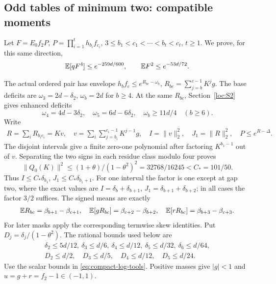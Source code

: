 \subsection{Odd tables of minimum two: compatible moments}\label{loc:S15}
Let $F=E_0f_2P$, $P=\prod_{i=1}^t h_{b_i}f_{c_i}$,
$3\le b_1<c_1<\cdots<b_t<c_t$, $t\ge1$.
We prove, for this same direction,
\[
 \mathbb E[qF^4]\le e^{-259d/600},\qquad \mathbb E F^2\le e^{-53d/72}.
\]

The actual ordered pair has envelope $h_bf_c\le e^{R_{bc}-\omega_b}$,
$R_{bc}=\sum_{j=b}^{c-1}K^jg$.
The base deficits are $\omega_3=2d-\delta_{2}$, $\omega_b=2d$ for $b\ge4$.
At the same $R_{bc}$, Section~\ref{loc:S2} gives enhanced deficits
\[
 \omega_4=4d-3\delta_{2},\quad\omega_5=6d-6\delta_{2},\quad
 \omega_b\ge11d/4\quad(b\ge6).
\]
Write
\begin{gather*}
 R=\sum_iR_{b_ic_i}=Kv,\quad
 v=\sum_i\sum_{j=b_i}^{c_i-1}K^{j-1}g,\quad
 I=\|v\|_2^2,\quad J_1=\|R\|_2^2,\quad
 P\le e^{R-\Delta}.
\end{gather*}
The disjoint intervals give a finite zero-one polynomial after factoring
$K^{b_1-1}$ out of $v$. Separating the two signs in each residue class
modulo four proves
\[
 \|Q_0(K)\|^2\le(1+\theta)/(1-\theta^2)^2
 =32768/16245<C_*=101/50.
\]
Thus $I\le C_*\delta_{b_1}$, $J_1\le C_*\delta_{b_1+1}$.
For one interval the factor is one except at gap two, where the exact
values are $I=\delta_{b}+\delta_{b+1}$, $J_1=\delta_{b+1}+\delta_{b+2}$; in all cases the
factor $3/2$ suffices. The signed means are exactly
\begin{gather*}
 \mathbb E R_{bc}=\beta_{b+1}-\beta_{c+1},\quad
 \mathbb E[gR_{bc}]=\beta_{c+2}-\beta_{b+2},\quad
 \mathbb E[rR_{bc}]=\beta_{b+3}-\beta_{c+3}.
\end{gather*}
For later masks apply the corresponding termwise skew identities.
Put $D_j=\delta_{j}/(1-\theta^2)$. The rational bounds used below are
\begin{gather*}
 \delta_{2}\le5d/12,\ \delta_{3}\le d/6,\ \delta_{4}\le d/12,\ \delta_{5}\le d/32,\ \delta_{6}\le d/64,\\
 D_2\le d/2,\quad D_3\le d/5,\quad D_4\le d/12,\quad D_5\le d/24.
\end{gather*}
Use the scalar bounds in \eqref{eq:compact-log-tools}.
Positive masses give $|g|<1$ and $u=g+r=f_2-1\in(-1,1)$.

